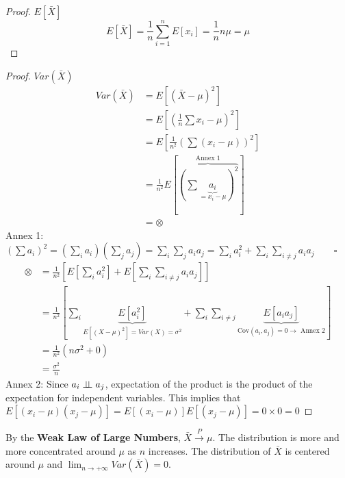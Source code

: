 \begin{proof}
    \textbf{$E[\bar{X}]$}
    \begin{equation*}
        E[\bar{X}] = \frac{1}{n}\sum_{i=1}^{n}E[x_i] = \frac{1}{n}n\mu = \mu
    \end{equation*}
\end{proof}
\begin{proof}
    $Var(\bar{X})$
    \begin{align*}
        Var(\bar{X}) & = E[(\bar{X}-\mu)^2]\\
        & = E[(\frac{1}{n}\sum x_i-\mu)^2]\\
        & = E[\frac{1}{n^2}(\sum(x_i-\mu))^2]\\
        & = \frac{1}{n^2}E[\overbrace{(\sum \underbrace{a_i}_{= x_i-\mu})^2}^{\text{Annex 1}}]\\
        & = \otimes
    \end{align*}
    Annex 1: $(\sum a_i)^2 = (\sum_i a_i)(\sum_j a_j) = \sum_i \sum_j a_ia_j = \sum_i a_i^2 + \sum_i \sum_{i\neq j}a_ia_j \qquad\square$
    \begin{align*}
        \otimes & = \frac{1}{n^2}[E[\sum_i a_i^2] + E[\sum_i \sum_{i\neq j}a_ia_j]]\\
        & = \frac{1}{n^2}[\sum_i \underbrace{E[a_i^2]}_{E[(X-\mu)^2] = Var(X) = \sigma^2} + \sum_i \sum_{i\neq j}\underbrace{E[a_ia_j]}_{\text{Cov}(a_i,a_j) = 0\to\text{ Annex 2}}]\\
        & = \frac{1}{n^2}(n\sigma^2 + 0)\\
        & = \frac{\sigma^2}{n}
    \end{align*}
    Annex 2: Since $a_i\perp\!\!\!\perp a_j$, expectation of the product is the product of the expectation for independent variables.
    This implies that $E[(x_i-\mu)(x_j-\mu)] = E[(x_i-\mu)]E[(x_j-\mu)] = 0\times 0 = 0$
\end{proof}
By the \textbf{Weak Law of Large Numbers}, $\bar{X}\overset{P}{\to}\mu$. The distribution is more and more concentrated around $\mu$ as $n$ increases. 
The distribution of $\bar{X}$ is centered around $\mu$ and $\lim_{n\to+\infty}Var(\bar{X}) = 0$.
